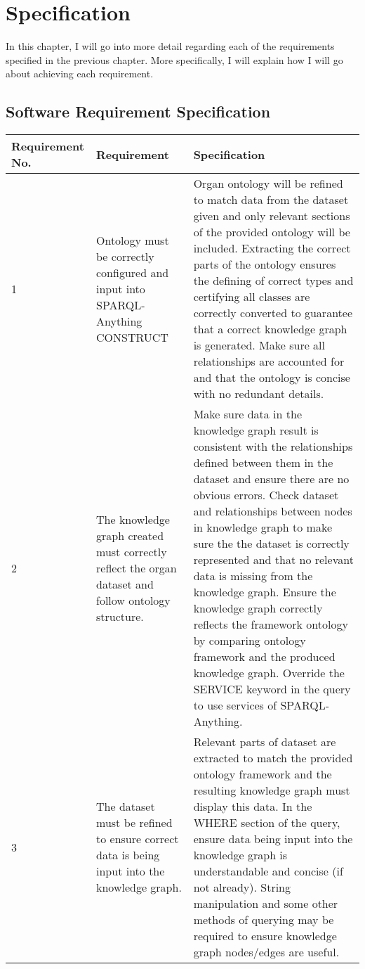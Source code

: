 \chapter{Specification}
In this chapter, I will go into more detail regarding each of the requirements specified in the previous chapter. More specifically, I will explain how I will go about achieving each requirement. 

\section{Software Requirement Specification}
\begin{longtable}{|p{2.25cm}|p{5.5cm}|p{5.5cm}|}
\hline
\textbf{Requirement No.} & \textbf{Requirement} & \textbf{Specification}\\
\hline

1& 
Ontology must be correctly configured and input into SPARQL-Anything CONSTRUCT &
Organ ontology will be refined to match data from the dataset given and only relevant sections of the provided ontology will be included. Extracting the correct parts of the ontology ensures the defining of correct types and certifying all classes are correctly converted to guarantee that a correct knowledge graph is generated. Make sure all relationships are accounted for and that the ontology is concise with no redundant details. \\
\hline

2&
The knowledge graph created must correctly reflect the organ dataset and follow ontology structure. &
Make sure data in the knowledge graph result is consistent with the relationships defined between them in the dataset and ensure there are no obvious errors. Check dataset and relationships between nodes in knowledge graph to make sure the the dataset is correctly represented and that no relevant data is missing from the knowledge graph. Ensure the knowledge graph correctly reflects the framework ontology by comparing ontology framework and the produced knowledge graph. Override the SERVICE keyword in the query to use services of SPARQL-Anything. \\
\hline

3&
The dataset must be refined to ensure correct data is being input into the knowledge graph. &
Relevant parts of dataset are extracted to match the provided ontology framework and the resulting knowledge graph must display this data. In the WHERE section of the query, ensure data being input into the knowledge graph is understandable and concise (if not already). String manipulation and some other methods of querying may be required to ensure knowledge graph nodes/edges are useful. \\
\hline


\end{longtable}
